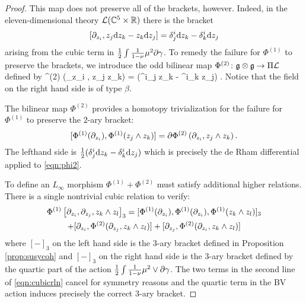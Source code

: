 \begin{proof}
This map does not preserve all of the brackets, however. 
Indeed, in the eleven-dimensional theory $\mathcal L(\mathbb C^5 \times \mathbb R)$ there is the bracket 
\[
\left[\partial_{z_i}, z_j {\rm d} z_k - z_k {\rm d} z_j\right] = \delta^i_j {\rm d} z_k - \delta^i_k {\rm d} z_j 
\]
arising from the cubic term in $\frac12 \int \frac{1}{1-\nu} \mu^2 \partial \gamma$. 
To remedy the failure for $\Phi^{(1)}$ to preserve the brackets, we introduce the odd bilinear map $\Phi^{(2)} \colon \mathfrak g \otimes \mathfrak g \to \Pi \mathcal L$ defined by 
\beqn\label{eqn:phi2}
\Phi^{(2)} \left(\partial_{z_i} , z_j \wedge z_k\right) =  (\delta^i_j z_k - \delta^i_k z_j) .
\eeqn
Notice that the field on the right hand side is of type $\beta$. 

The bilinear map $\Phi^{(2)}$ provides a homotopy trivialization for the failure for $\Phi^{(1)}$ to preserve the $2$-ary bracket: 
\[
[\Phi^{(1)} (\partial_{z_i}) , \Phi^{(1)}(z_j \wedge z_k)] = \partial \Phi^{(2)}\left(\partial_{z_i} , z_j \wedge z_k\right).
\]
The lefthand side is $\frac12 (\delta_j^i {\rm d} z_k - \delta_k^i {\rm d} z_j)$ which is precisely the de Rham differential applied to \eqref{eqn:phi2}.

To define an $L_\infty$ morphism $\Phi^{(1)} + \Phi^{(2)}$ must satisfy additional higher relations. 
There is a single nontrivial cubic relation to verify:
\begin{multline} \label{eqn:cubicrln}
\Phi^{(1)}\left[\partial_{z_i}, \partial_{z_j}, z_k \wedge z_l\right]_3 = [\Phi^{(1)}(\partial_{z_i}), \Phi^{(1)}(\partial_{z_i}), \Phi^{(1)}(z_k \wedge z_l)]_3 \\ + [\partial_{z_i}, \Phi^{(2)}(\partial_{z_j}, z_k \wedge z_l)] + [\partial_{z_j}, \Phi^{(2)}(\partial_{z_i}, z_k \wedge z_l)]
\end{multline}
where $[-]_3$ on the left hand side is the $3$-ary bracket defined in Proposition \ref{prop:susycoh} and $[-]_3$ on the right hand side is the $3$-ary bracket defined by the quartic part of the action $\frac12 \int \frac{1}{1-\nu} \mu^2 \vee \partial \gamma$. 
The two terms in the second line of \eqref{eqn:cubicrln} cancel for symmetry reasons and the quartic term in the BV action induces precisely the correct $3$-ary bracket. 

\end{proof}

